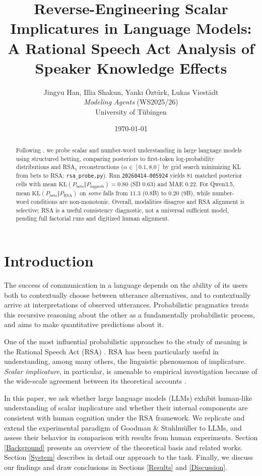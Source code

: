 \documentclass[11pt]{article}
\title{Reverse-Engineering Scalar Implicatures in Language Models:\\
A Rational Speech Act Analysis of Speaker Knowledge Effects}
\author{Jingyu Han, Illia Shakun, Yankı Öztürk, Lukas Viestädt \\
\textit{Modeling Agents} (WS2025/26) \\ University of Tübingen}
\date{\today}
\begin{document}
\maketitle

\begin{abstract}
Following \citet{goodmanstuhlmuller2013}, we probe scalar and number-word understanding in large language models using structured betting, comparing posteriors to first-token log-probability distributions and RSA$_1$ reconstructions ($\alpha\in[0.1,8.0]$ by grid search minimizing KL from bets to RSA; \texttt{rsa\_probe.py}). Run \texttt{20260414-005924} yields $81$ matched posterior cells with mean $\mathrm{KL}(P_{\text{bets}}\Vert P_{\text{logprob}}){=}0.80$ (SD $0.63$) and MAE $0.22$. For Qwen3.5, mean $\mathrm{KL}(P_{\text{bets}}\Vert P_{\text{RSA}})$ on \emph{some} falls from $11.3$ (0.8B) to $0.20$ (9B), while number-word conditions are non-monotonic. Overall, modalities disagree and RSA alignment is selective; RSA is a useful consistency diagnostic, not a universal sufficient model, pending full factorial runs and digitized human alignment.
\end{abstract}

\section{Introduction}
\label{Introduction}

The success of communication in a language depends on the ability of its users both to contextually choose between utterance alternatives, and to contextually arrive at interpretations of observed utterances. Probabilistic pragmatics treats this recursive reasoning about the other as a fundamentally probabilistic process, and aims to make quantitative predictions about it. 

One of the most influential probabilistic approaches to the study of meaning is the Rational Speech Act (RSA) \cite{goodmanfrank2016}. RSA has been particularly useful in understanding, among many others, the linguistic phenomenon of implicature. \textit{Scalar implicature}, in particular, is amenable to empirical investigation because of the wide-scale agreement between its theoretical accounts \cite{katsoscummins2010}.

In this paper, we ask whether large language models (LLMs) exhibit human-like understanding of scalar implicature and whether their internal components are consistent with human cognition under the RSA framework. We replicate and extend the experimental paradigm of Goodman \& Stuhlmüller \cite{goodmanstuhlmuller2013} to LLMs, and assess their behavior in comparison with results from human experiments. Section \ref{Background} presents an overview of the theoretical basis and related works. Section \ref{System} describes in detail our approach to the task. Finally, we discuss our findings and draw conclusions in Sections \ref{Results} and \ref{Discussion}.
\end{document}
